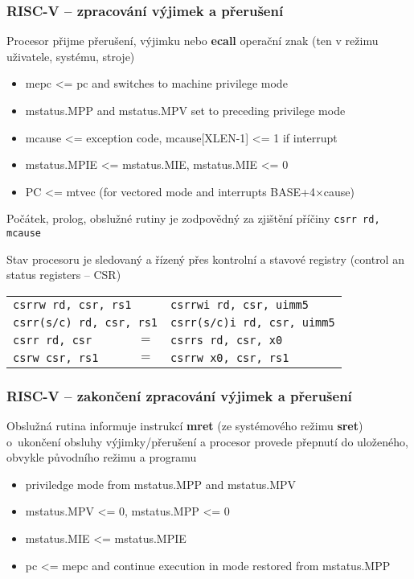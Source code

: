 \documentclass{beamer}
\begin{document}
\begin{frame}
\frametitle{RISC-V -- zpracování výjimek a přerušení}

Procesor přijme přerušení, výjimku nebo \textbf{ecall} operační znak (ten v režimu uživatele, systému, stroje)

\begin{itemize}
 \item mepc <= pc and switches to machine privilege mode
 \item mstatus.MPP and mstatus.MPV set to preceding privilege mode
 \item mcause <= exception code, mcause[XLEN-1] <= 1 if interrupt
 \item mstatus.MPIE <= mstatus.MIE, mstatus.MIE <= 0
 \item PC <= mtvec (for vectored mode and interrupts BASE+4×cause)
\end{itemize}

Počátek, prolog, obslužné rutiny je zodpovědný za zjištění příčiny \texttt{csrr rd, mcause}

Stav procesoru je sledovaný a řízený přes kontrolní a stavové registry (control an status registers -- CSR)

\begin{tabular}{l c l}
\multicolumn{2}{l}{\texttt{csrrw rd, csr, rs1}} & \texttt{csrrwi rd, csr, uimm5} \\
\multicolumn{2}{l}{\texttt{csrr(s/c) rd, csr, rs1}}  & \texttt{csrr(s/c)i rd, csr, uimm5} \\
\texttt{csrr rd, csr} &  $=$  & \texttt{csrrs rd, csr, x0} \\
\texttt{csrw csr, rs1} &  $=$  & \texttt{csrrw x0, csr, rs1} \\
\end{tabular}
\end{frame}

\begin{frame}
\frametitle{RISC-V -- zakončení zpracování výjimek a přerušení}

Obslužná rutina informuje instrukcí \textbf{mret} (ze systémového režimu \textbf{sret})
o~ukončení obsluhy výjimky/přerušení a procesor provede přepnutí do uloženého, obvykle původního
režimu a programu

\begin{itemize}
 \item priviledge mode from mstatus.MPP and mstatus.MPV
 \item mstatus.MPV <= 0, mstatus.MPP <= 0
 \item mstatus.MIE <= mstatus.MPIE
 \item pc <= mepc and continue execution in mode restored from mstatus.MPP
\end{itemize}
\end{frame}
\end{document}
